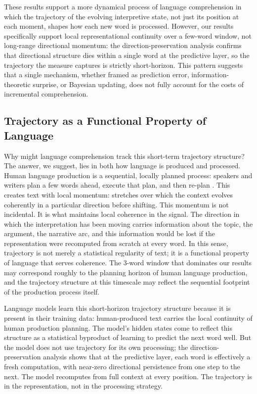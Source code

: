 \documentclass[12pt]{article}
\begin{document}
These results support a more dynamical process of language comprehension in which the trajectory of the evolving interpretive state, not just its position at each moment, shapes how each new word is processed. However, our results specifically support local representational continuity over a few-word window, not long-range directional momentum: the direction-preservation analysis confirms that directional structure dies within a single word at the predictive layer, so the trajectory the measure captures is strictly short-horizon. This pattern suggests that a single mechanism, whether framed as prediction error, information-theoretic surprise, or Bayesian updating, does not fully account for the costs of incremental comprehension.

\subsection{Trajectory as a Functional Property of Language}

Why might language comprehension track this short-term trajectory structure? The answer, we suggest, lies in both how language is produced and processed. Human language production is a sequential, locally planned process: speakers and writers plan a few words ahead, execute that plan, and then re-plan \citep{levelt1989,ferreira2002}. This creates text with local momentum: stretches over which the context evolves coherently in a particular direction before shifting. This momentum is not incidental. It is what maintains local coherence in the signal. The direction in which the interpretation has been moving carries information about the topic, the argument, the narrative arc, and this information would be lost if the representation were recomputed from scratch at every word. In this sense, trajectory is not merely a statistical regularity of text; it is a functional property of language that serves coherence. The 3-word window that dominates our results may correspond roughly to the planning horizon of human language production, and the trajectory structure at this timescale may reflect the sequential footprint of the production process itself.

Language models learn this short-horizon trajectory structure because it is present in their training data: human-produced text carries the local continuity of human production planning. The model's hidden states come to reflect this structure as a statistical byproduct of learning to predict the next word well. But the model does not use trajectory for its own processing; the direction-preservation analysis shows that at the predictive layer, each word is effectively a fresh computation, with near-zero directional persistence from one step to the next. The model recomputes from full context at every position. The trajectory is in the representation, not in the processing strategy.
\end{document}
